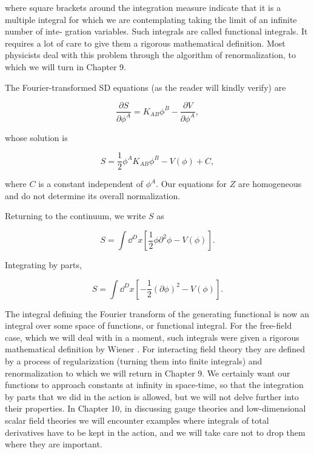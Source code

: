 where square brackets around the integration measure indicate that it is a multiple
integral for which we are contemplating taking the limit of an infinite number of inte-
gration variables. Such integrals are called functional integrals. It requires a lot of care
to give them a rigorous mathematical definition. Most physicists deal with this problem
through the algorithm of renormalization, to which we will turn in Chapter 9.

The Fourier-transformed SD equations (as the reader will kindly verify) are

\[
\frac{\partial S}{\partial\phi^A}=K_{AB}\phi^B-\frac{\partial V}{\partial\phi^A},
\]

whose solution is

\begin{equation}
S=\frac12\phi^AK_{AB}\phi^B-V(\phi)+C,
\label{eq:3.12}
\end{equation}

where $C$ is a constant independent of $\phi^A$. Our equations for $Z$ are homogeneous and
do not determine its overall normalization.

Returning to the continuum, we write $S$ as

\begin{equation}
S=\int\dd^D x\left[\frac12\phi\partial^2\phi-V(\phi)\right].
\label{eq:3.13}
\end{equation}

Integrating by parts,

\begin{equation}
S=\int\dd^D x\left[-\frac12(\partial\phi)^2-V(\phi)\right].
\label{eq:3.14}
\end{equation}

The integral defining the Fourier transform of the generating functional is now an
integral over some space of functions, or functional integral. For the free-field case,
which we will deal with in a moment, such integrals were given a rigorous mathematical
definition by Wiener \cite{banks-ref-12}. For interacting field theory they are defined by a process of
regularization (turning them into finite integrals) and renormalization to which we will
return in Chapter 9. We certainly want our functions to approach constants at infinity
in space-time, so that the integration by parts that we did in the action is allowed, but we
will not delve further into their properties. In Chapter 10, in discussing gauge theories
and low-dimensional scalar field theories we will encounter examples where integrals
of total derivatives have to be kept in the action, and we will take care not to drop them
where they are important.

